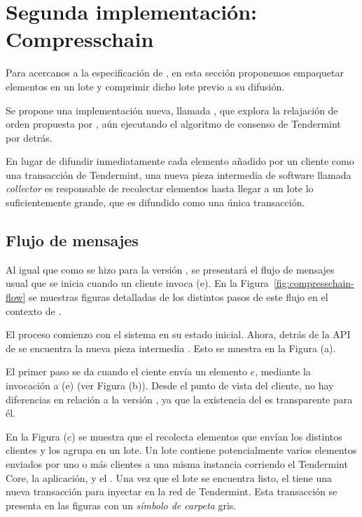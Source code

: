 

\section{Segunda implementación: Compresschain}\label{subsec:compresschain}

Para acercanos a la especificación de \setchain, en esta sección proponemos
empaquetar elementos en un lote y comprimir dicho lote
previo a su difusión.
%

Se propone una implementación nueva, llamada \compresschain, que explora
la relajación de orden propuesta por \setchain, aún ejecutando el algoritmo de
consenso de Tendermint por detrás.
%

En lugar de difundir inmediatamente cada elemento añadido por un cliente como una
transacción de Tendermint, una nueva pieza intermedia de software llamada \textit{collector}
es responsable de recolectar elementos hasta llegar a un lote lo suficientemente grande,
que es difundido como una única transacción.
%

\subsection{Flujo de mensajes}
Al igual que como se hizo para la versión \vanilla, se presentará el flujo de mensajes usual
que se inicia cuando un cliente invoca \Add(e).
En la Figura~\ref{fig:compresschain-flow} se muestras figuras detalladas de los distintos pasos de
este flujo en el contexto de \compresschain.
%

El proceso comienzo con el sistema en su estado inicial. Ahora, detrás de la API de \setchain
se encuentra la nueva pieza intermedia \collector. Esto se muestra en la Figura (a).

%

El primer paso se da cuando el ciente envía un elemento $e$, mediante la invocación a \Add(e) (ver
Figura (b)).
Desde el punto de vista del cliente, no hay diferencias en relación a la versión \vanilla, ya que
la existencia del \collector es transparente para él.

%

En la Figura (c) se muestra que el \collector recolecta elementos que envían los distintos clientes y los agrupa
en un lote.
Un lote contiene potencialmente varios elementos enviados por uno o más clientes a una misma instancia
corriendo el Tendermint Core, la aplicación, y el \collector.
Una vez que el lote se encuentra listo, el \collector tiene una nueva transacción para inyectar en la red de Tendermint.
Esta transacción se presenta en las figuras con un \textit{símbolo de carpeta} gris.

